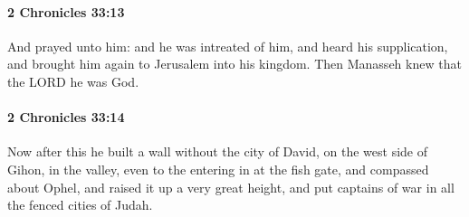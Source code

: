 		\paragraph{2 Chronicles 33:13} %
			\label{2CHRONICLES-33-13}

			And prayed unto him: and he was intreated of him, and heard his supplication, and brought him again to Jerusalem into his kingdom. Then Manasseh knew that the LORD he was God.


		\paragraph{2 Chronicles 33:14} %
			\label{2CHRONICLES-33-14}

			Now after this he built a wall without the city of David, on the west side of Gihon, in the valley, even to the entering in at the fish gate, and compassed about Ophel, and raised it up a very great height, and put captains of war in all the fenced cities of Judah.

